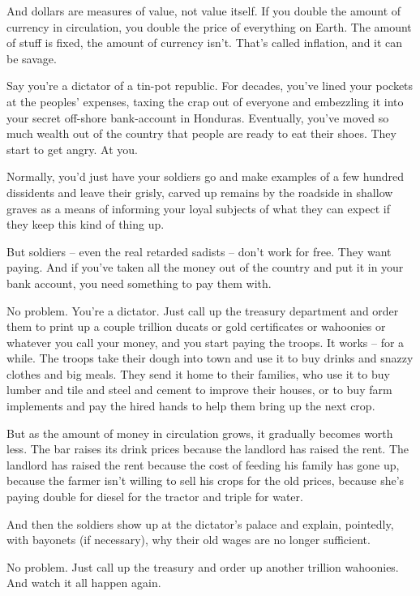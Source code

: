 And dollars are measures of value, not value itself. If you double
the amount of currency in circulation, you double the price of
everything on Earth. The amount of stuff is fixed, the amount of
currency isn't. That's called inflation, and it can be savage.

Say you're a dictator of a tin-pot republic. For decades, you've
lined your pockets at the peoples' expenses, taxing the crap out of
everyone and embezzling it into your secret off-shore bank-account
in Honduras. Eventually, you've moved so much wealth out of the
country that people are ready to eat their shoes. They start to get
angry. At you.

Normally, you'd just have your soldiers go and make examples of a
few hundred dissidents and leave their grisly, carved up remains by
the roadside in shallow graves as a means of informing your loyal
subjects of what they can expect if they keep this kind of thing
up.

But soldiers -- even the real retarded sadists -- don't work for
free. They want paying. And if you've taken all the money out of
the country and put it in your bank account, you need something to
pay them with.

No problem. You're a dictator. Just call up the treasury department
and order them to print up a couple trillion ducats or gold
certificates or wahoonies or whatever you call your money, and you
start paying the troops. It works -- for a while. The troops take
their dough into town and use it to buy drinks and snazzy clothes
and big meals. They send it home to their families, who use it to
buy lumber and tile and steel and cement to improve their houses,
or to buy farm implements and pay the hired hands to help them
bring up the next crop.

But as the amount of money in circulation grows, it gradually
becomes worth less. The bar raises its drink prices because the
landlord has raised the rent. The landlord has raised the rent
because the cost of feeding his family has gone up, because the
farmer isn't willing to sell his crops for the old prices, because
she's paying double for diesel for the tractor and triple for
water.

And then the soldiers show up at the dictator's palace and explain,
pointedly, with bayonets (if necessary), why their old wages are no
longer sufficient.

No problem. Just call up the treasury and order up another trillion
wahoonies. And watch it all happen again.

